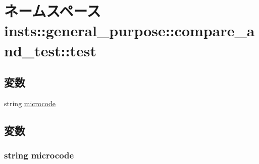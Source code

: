 \hypertarget{namespaceinsts_1_1general__purpose_1_1compare__and__test_1_1test}{
\section{ネームスペース insts::general\_\-purpose::compare\_\-and\_\-test::test}
\label{namespaceinsts_1_1general__purpose_1_1compare__and__test_1_1test}
}
\subsection*{変数}
\begin{DoxyCompactItemize}
\item 
string \hyperlink{namespaceinsts_1_1general__purpose_1_1compare__and__test_1_1test_a770f11a173e99389a8802f0107ed8f52}{microcode}
\end{DoxyCompactItemize}


\subsection{変数}
\hypertarget{namespaceinsts_1_1general__purpose_1_1compare__and__test_1_1test_a770f11a173e99389a8802f0107ed8f52}{
\subsubsection[{microcode}]{\setlength{\rightskip}{0pt plus 5cm}string {\bf microcode}}}
\label{namespaceinsts_1_1general__purpose_1_1compare__and__test_1_1test_a770f11a173e99389a8802f0107ed8f52}
